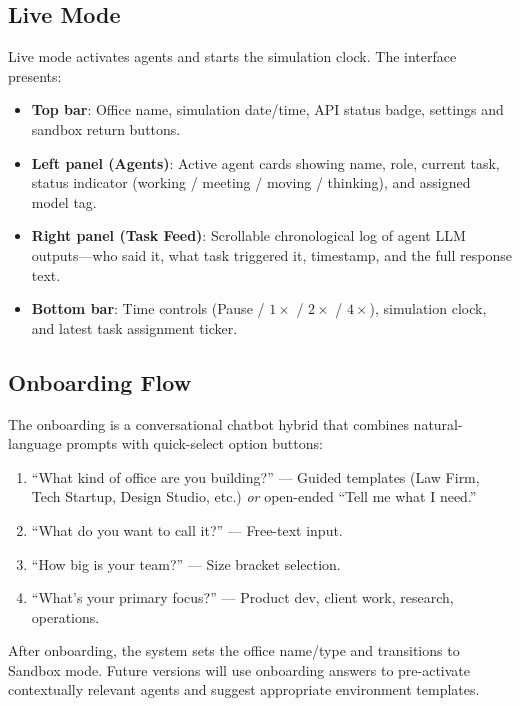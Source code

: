 \documentclass[11pt,letterpaper]{article}
\begin{document}
\subsection{Live Mode}

Live mode activates agents and starts the simulation clock. The interface presents:

\begin{itemize}[leftmargin=2em]
  \item \textbf{Top bar}: Office name, simulation date/time, API status badge, settings and sandbox return buttons.
  \item \textbf{Left panel (Agents)}: Active agent cards showing name, role, current task, status indicator (working / meeting / moving / thinking), and assigned model tag.
  \item \textbf{Right panel (Task Feed)}: Scrollable chronological log of agent LLM outputs---who said it, what task triggered it, timestamp, and the full response text.
  \item \textbf{Bottom bar}: Time controls (Pause / $1\times$ / $2\times$ / $4\times$), simulation clock, and latest task assignment ticker.
\end{itemize}

\subsection{Onboarding Flow}

The onboarding is a conversational chatbot hybrid that combines natural-language prompts with quick-select option buttons:

\begin{enumerate}[leftmargin=2em]
  \item ``What kind of office are you building?'' --- Guided templates (Law Firm, Tech Startup, Design Studio, etc.) \emph{or} open-ended ``Tell me what I need.''
  \item ``What do you want to call it?'' --- Free-text input.
  \item ``How big is your team?'' --- Size bracket selection.
  \item ``What's your primary focus?'' --- Product dev, client work, research, operations.
\end{enumerate}

After onboarding, the system sets the office name/type and transitions to Sandbox mode. Future versions will use onboarding answers to pre-activate contextually relevant agents and suggest appropriate environment templates.
\end{document}
